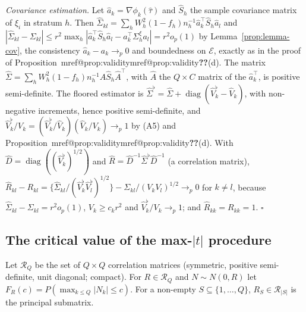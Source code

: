 \documentclass[pdflatex,sn-mathphys-num,iicol]{sn-jnl}
\makeatletter
\theoremstyle{thmstyleone}
\theoremstyle{thmstyletwo}
\theoremstyle{thmstylethree}
\newcommand{\Mref}[1]{\ifcsname mref@#1\endcsname\csname mref@#1\endcsname\else\textbf{??}\fi}
\makeatother
\begin{document}
\emph{Covariance estimation.} Let $\hat a_k=\nabla\phi_k(\hat\tau)$ and $\hat S_h$ the sample covariance matrix of $\xi_i$ in stratum $h$. Then $\hat\Sigma_{kl}=\sum_hW_h^2(1-f_h)n_h^{-1}\hat a_k^\top\hat S_h\hat a_l$ and $|\hat\Sigma_{kl}-\Sigma_{kl}|\le r^2\max_h|\hat a_k^\top\hat S_h\hat a_l-a_k^\top\Sigma^\xi_ha_l|=r^2o_p(1)$ by Lemma~\ref{prop:lemma-cov}, the consistency $\hat a_k-a_k\to_p0$ and boundedness on $\mathcal E$, exactly as in the proof of Proposition~\Mref{prop:validity}(d). The matrix $\hat\Sigma=\sum_hW_h^2(1-f_h)n_h^{-1}\hat A\hat S_h\hat A^\top$, with $\hat A$ the $Q\times C$ matrix of the $\hat a_k^\top$, is positive semi-definite. The floored estimator is $\hat\Sigma^\flat=\hat\Sigma+\operatorname{diag}(\hat V^\flat_k-\hat V_k)$, with non-negative increments, hence positive semi-definite, and $\hat V^\flat_k/V_k=(\hat V_k^\flat/\hat V_k)(\hat V_k/V_k)\to_p1$ by (A5) and Proposition~\Mref{prop:validity}(d). With $\hat D=\operatorname{diag}((\hat V^\flat_k)^{1/2})$ and $\hat R=\hat D^{-1}\hat\Sigma^\flat\hat D^{-1}$ (a correlation matrix),
$\hat R_{kl}-R_{kl}=\{\hat\Sigma_{kl}/(\hat V_k^\flat\hat V_l^\flat)^{1/2}\}-\Sigma_{kl}/(V_kV_l)^{1/2}\to_p0$ for $k\ne l$, because $\hat\Sigma_{kl}-\Sigma_{kl}=r^2o_p(1)$, $V_k\ge c_kr^2$ and $\hat V^\flat_k/V_k\to_p1$; and $\hat R_{kk}=R_{kk}=1$. $\square$

\subsection{The critical value of the max-\texorpdfstring{$|t|$}{t} procedure}\label{si:testing-crit}

Let $\mathcal R_Q$ be the set of $Q\times Q$ correlation matrices (symmetric, positive semi-definite, unit diagonal; compact). For $R\in\mathcal R_Q$ and $N\sim N(0,R)$ let $F_R(c)=P(\max_{k\le Q}|N_k|\le c)$. For a non-empty $S\subseteq\{1,\dots,Q\}$, $R_S\in\mathcal R_{|S|}$ is the principal submatrix.
\end{document}
